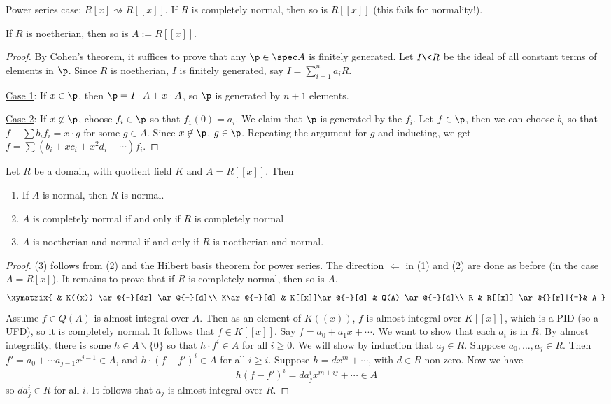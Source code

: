 \medskip
 Power series case: $R[x]\rightsquigarrow R[[x]]$. If $R$ is completely normal, then so
 is $R[[x]]$ (this fails for normality!).
 \begin{theorem}
   If $R$ is noetherian, then so is $A:=R[[x]]$.
 \end{theorem}
 \begin{proof}
   By Cohen's theorem, it suffices to prove that any $\p\in \spec A$ is finitely
   generated. Let $I\< R$ be the ideal of all constant terms of elements in $\p$. Since
   $R$ is noetherian, $I$ is finitely generated, say $I=\sum_{i=1}^n a_i R$.

   \underline{Case 1}: If $x\in \p$, then $\p=I\cdot A + x\cdot A$, so $\p$ is
   generated by $n+1$ elements.

   \underline{Case 2}: If $x\not\in \p$, choose $f_i\in \p$ so that $f_1(0)=a_i$. We
   claim that $\p$ is generated by the $f_i$. Let $f\in \p$, then we can choose $b_i$ so
   that $f-\sum b_i f_i = x\cdot g$ for some $g\in A$. Since $x\not\in \p$, $g\in \p$.
   Repeating the argument for $g$ and inducting, we get $f=\sum
   (b_i+xc_i+x^2d_i+\cdots)f_i$.
 \end{proof}
 \begin{theorem}
   Let $R$ be a domain, with quotient field $K$ and $A=R[[x]]$. Then
   \begin{enumerate}
     \item If $A$ is normal, then $R$ is normal.
     \item $A$ is completely normal if and only if $R$ is completely normal
     \item $A$ is noetherian and normal if and only if $R$ is noetherian and normal.
   \end{enumerate}
 \end{theorem}
 \begin{proof}
   (3) follows from (2) and the Hilbert basis theorem for power series. The direction
   $\Leftarrow$ in (1) and (2) are done as before (in the case $A=R[x]$). It remains to
   prove that if $R$ is completely normal, then so is $A$.
   \[\xymatrix{
    & K((x)) \ar@{-}[dr] \ar@{-}[d]\\
    K\ar@{-}[d] & K[[x]]\ar@{-}[d] & Q(A) \ar@{-}[d]\\
    R & R[[x]] \ar@{}[r]|{=}& A
   }\]
   Assume $f\in Q(A)$ is almost integral over $A$. Then as an element of $K((x))$, $f$ is
   almost integral over $K[[x]]$, which is a PID (so a UFD), so it is completely normal.
   It follows that $f\in K[[x]]$. Say $f=a_0 + a_1x+ \cdots$. We want to show that each
   $a_i$ is in $R$. By almost integrality, there is some $h\in A\smallsetminus \{0\}$ so
   that $h\cdot f^i\in A$ for all $i\ge 0$. We will show by induction that $a_j\in R$.
   Suppose $a_0,\dots, a_j\in R$. Then $f'=a_0+\cdots a_{j-1}x^{j-1}\in A$, and $h\cdot
   (f-f')^i \in A$ for all $i\ge i$. Suppose $h=dx^m+ \cdots$, with $d\in R$ non-zero.
   Now we have
   \[
    h(f-f')^i = da_j^i x^{m+ij} + \cdots \in A
   \]
   so $da_j^i\in R$ for all $i$. It follows that $a_j$ is almost integral over $R$.
 \end{proof}
